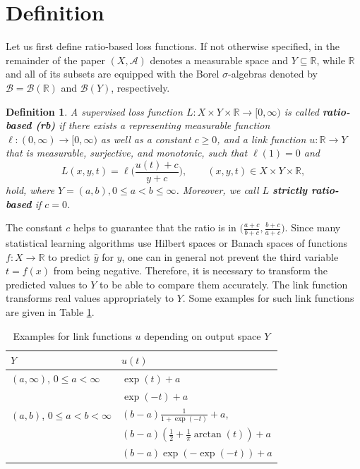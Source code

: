 \documentclass[10pt]{article}
\newcommand{\R}{\mathbb{R}}
\newcommand{\XY}{X \times Y}
\newcommand{\B}  {\mathcal{B}}   %
\newtheorem{definition}[theorem]{Definition}
\begin{document}
\section{Definition} \label{Kap_Def}
Let us first define ratio-based loss functions. 
If not otherwise specified, in the remainder  of the paper $(X, \mathcal{A})$ denotes a measurable space and $Y \subseteq \R$, while $\R$ and all of its subsets are equipped with the Borel $\sigma$-algebras denoted by $\B=\B(\R)$ and
$\B(Y)$, respectively.
\begin{definition} \label{Def_ratiobasedLoss}
	A supervised loss function $L: \XY \times \R \to [0, \infty)$ is called \textbf{ratio-based (rb)} if there exists a representing measurable function $\ell: (0, \infty) \to [0, \infty)$ as well as a constant $c\geq 0$, and a link function $u:\R \to Y$ that is measurable, surjective, and monotonic, such that $\ell(1) = 0$ and 
	\begin{equation} \label{ratiobased}
		L(x,y,t) = \ell\biggl( \frac{u(t) + c}{y + c} \biggr), \qquad (x,y,t) \in \XY \times \R,	
	\end{equation}
	hold, where $Y = (a,b), 0 \leq a < b \leq \infty$. 
	Moreover, we call $L$ \textbf{strictly ratio-based} if $c=0$.
\end{definition}
The constant $c$ helps to guarantee that the ratio is in $\bigl(\frac{a+c}{b+c}, \frac{b+c}{a+c}\bigr)$.
Since many statistical learning algorithms use Hilbert spaces or Banach spaces of functions $f:X\to\R$ to predict $\hat{y}$ for $y$, one can in general not prevent the third variable $t=f(x)$ from being negative.
Therefore, it is necessary to transform the predicted values to $Y$ to be able to compare them accurately.
The link function transforms real values appropriately to $Y$.
Some examples for such link functions are given in Table \ref{table_u}. \par
\begin{table}[ht]
	\centering
	\renewcommand{\arraystretch}{1.2}
	\caption{Examples for link functions $u$ depending on output space $Y$}
	\begin{tabular}{l|l}
		$Y$ & $u(t)$ \\
		\midrule
		$(a, \infty)$, $0 \leq a < \infty$ & $\exp(t) + a$ \\
		& $\exp(-t) + a$ \\
		$(a,b)$, $0 \leq a < b < \infty$ & $(b-a)\frac{1}{1+\exp(-t)} + a$, \\
		& $(b-a)(\frac{1}{2} + \frac{1}{\pi}\arctan(t))+a$\\  
		& $(b-a)\exp(-\exp(-t))+a$ 
	\end{tabular}
	\label{table_u}
\end{table} 
\end{document}
